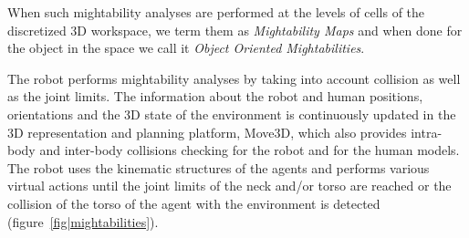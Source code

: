 \documentclass{svmult}
\begin{document}
When such mightability analyses are performed at the levels of cells of the
discretized 3D workspace, we term them as \emph{Mightability Maps} and when done
for the object in the space we call it \emph{Object Oriented Mightabilities}.

The robot performs mightability analyses by taking into account collision as
well as the joint limits. The information about the robot and human positions,
orientations and the 3D state of the environment is continuously updated in the
3D representation and planning platform, Move3D, which also
provides intra-body and inter-body collisions checking for the robot and for
the human models. The robot uses the kinematic structures of the agents and
performs various virtual actions until the joint limits of the neck and/or
torso are reached or the collision of the torso of the agent with the
environment is detected (figure~\ref{fig|mightabilities}).
\end{document}

